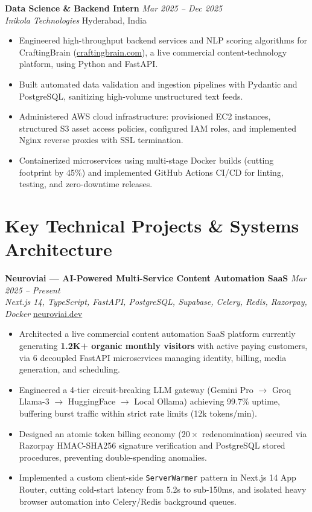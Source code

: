 \documentclass[9.5pt]{article}
\begin{document}
\vspace{2pt}
\textbf{Data Science \& Backend Intern} \hfill \textit{Mar 2025 -- Dec 2025} \\
\textit{Inikola Technologies} \hfill Hyderabad, India
\begin{itemize}
  \item Engineered high-throughput backend services and NLP scoring algorithms for CraftingBrain (\href{https://craftingbrain.com}{craftingbrain.com}), a live commercial content-technology platform, using Python and FastAPI.
  \item Built automated data validation and ingestion pipelines with Pydantic and PostgreSQL, sanitizing high-volume unstructured text feeds.
  \item Administered AWS cloud infrastructure: provisioned EC2 instances, structured S3 asset access policies, configured IAM roles, and implemented Nginx reverse proxies with SSL termination.
  \item Containerized microservices using multi-stage Docker builds (cutting footprint by 45\%) and implemented GitHub Actions CI/CD for linting, testing, and zero-downtime releases.
\end{itemize}

\section*{Key Technical Projects \& Systems Architecture}

\textbf{Neuroviai — AI-Powered Multi-Service Content Automation SaaS} \hfill \textit{Mar 2025 -- Present} \\
\textit{Next.js 14, TypeScript, FastAPI, PostgreSQL, Supabase, Celery, Redis, Razorpay, Docker} \hfill \href{https://neuroviai.dev}{neuroviai.dev}
\begin{itemize}
  \item Architected a live commercial content automation SaaS platform currently generating \textbf{1.2K+ organic monthly visitors} with active paying customers, via 6 decoupled FastAPI microservices managing identity, billing, media generation, and scheduling.
  \item Engineered a 4-tier circuit-breaking LLM gateway (Gemini Pro $\to$ Groq Llama-3 $\to$ HuggingFace $\to$ Local Ollama) achieving 99.7\% uptime, buffering burst traffic within strict rate limits (12k tokens/min).
  \item Designed an atomic token billing economy ($20\times$ redenomination) secured via Razorpay HMAC-SHA256 signature verification and PostgreSQL stored procedures, preventing double-spending anomalies.
  \item Implemented a custom client-side \texttt{ServerWarmer} pattern in Next.js 14 App Router, cutting cold-start latency from 5.2s to sub-150ms, and isolated heavy browser automation into Celery/Redis background queues.
\end{itemize}
\end{document}

